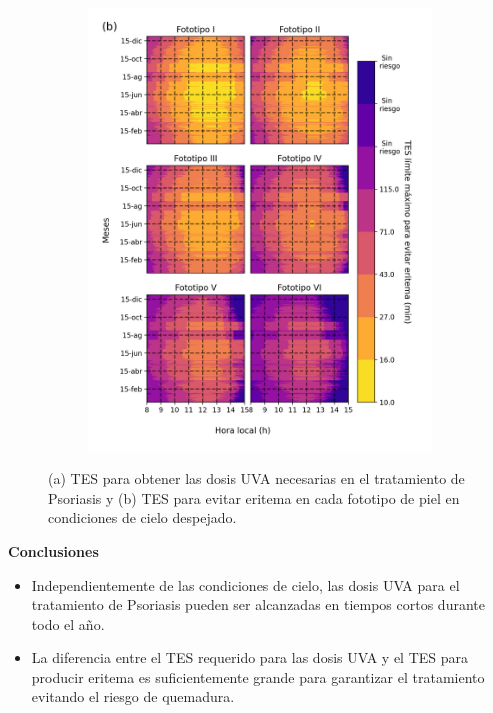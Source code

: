 \documentclass{article}
\begin{document}
\begin{multicols}{2}
\begin{figure}[H]
\begin{subfigure}[H]{0.4\linewidth}
        \includegraphics[scale=0.38]{images/ery.png}
    \end{subfigure}
\caption{(a) TES para obtener las dosis UVA necesarias en el tratamiento de Psoriasis y 
(b) TES para evitar eritema en cada fototipo de piel en condiciones de cielo despejado.}
\end{figure}
\begin{center}
\begin{shaded}
\textbf{\textcolor{na}{Conclusiones}}
\end{shaded}
\end{center}
\begin{itemize}
    \item Independientemente de las condiciones de cielo, las dosis UVA para el tratamiento de Psoriasis pueden ser alcanzadas en tiempos cortos durante todo el año.
    \item La diferencia entre el TES requerido para las dosis UVA y el TES para producir eritema es suficientemente grande para garantizar el tratamiento evitando el riesgo de quemadura.

\end{itemize}
\end{multicols}
\end{document}
